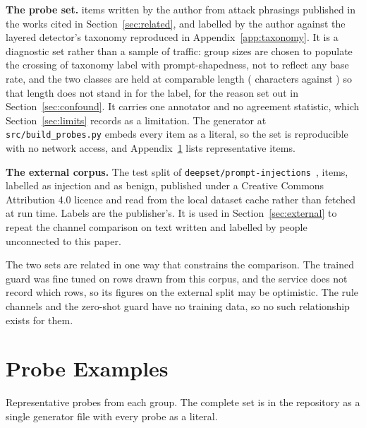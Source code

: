 \documentclass[conference]{IEEEtran}
\begin{document}
\textbf{The probe set.} \NProbes{} items written by the author from attack
phrasings published in the works cited in Section~\ref{sec:related}, and
labelled by the author against the layered detector's taxonomy reproduced in
Appendix~\ref{app:taxonomy}. It is a diagnostic set rather than a sample of
traffic: group sizes are chosen to populate the crossing of taxonomy label with
prompt-shapedness, not to reflect any base rate, and the two classes are held
at comparable length (\ProbeMeanLenAttack{} characters against
\ProbeMeanLenBenign{}) so that length does not stand in for the label, for the
reason set out in Section~\ref{sec:confound}. It carries one annotator and no
agreement statistic, which Section~\ref{sec:limits} records as a limitation.
The generator at \texttt{src/build\_probes.py} embeds every item as a literal,
so the set is reproducible with no network access, and
Appendix~\ref{app:probes} lists representative items.

\textbf{The external corpus.} The test split of \texttt{deepset/prompt-inject\-ions}~\cite{deepset_promptinjections},
\NExtRows{} items, \NExtInjection{} labelled as injection and \NExtBenign{} as
benign, published under a Creative Commons Attribution 4.0 licence and read
from the local dataset cache rather than fetched at run time. Labels are the
publisher's. It is used in Section~\ref{sec:external} to repeat the channel
comparison on text written and labelled by people unconnected to this paper.

The two sets are related in one way that constrains the comparison. The trained
guard was fine tuned on \NExternalRowsTr{} rows drawn from this corpus, and the
service does not record which rows, so its figures on the external split may be
optimistic. The rule channels and the zero-shot guard have no training data,
so no such relationship exists for them.

\section{Probe Examples}\label{app:probes}

Representative probes from each group. The complete set is in the repository as
a single generator file with every probe as a literal.
\end{document}
